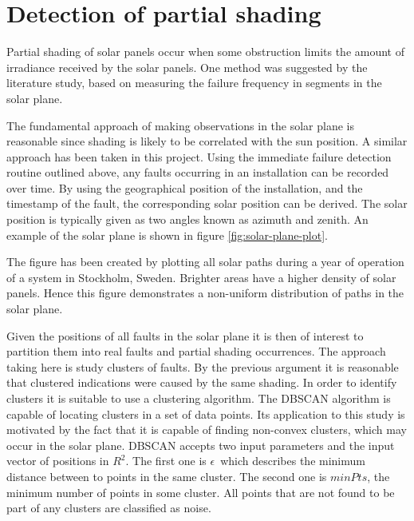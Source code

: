 \clearpage
\section{Detection of partial shading}
Partial shading of solar panels occur when some obstruction limits the amount of irradiance received by the solar panels.
One method was suggested by the literature study, based on measuring the failure frequency in segments in the solar plane.

The fundamental approach of making observations in the solar plane is reasonable since shading is likely to be correlated with the sun position.
A similar approach has been taken in this project.
Using the immediate failure detection routine outlined above, any faults occurring in an installation can be recorded over time.
By using the geographical position of the installation, and the timestamp of the fault, the corresponding solar position can be derived.
The solar position is typically given as two angles known as azimuth and zenith.
An example of the solar plane is shown in figure \ref{fig:solar-plane-plot}.


The figure has been created by plotting all solar paths during a year of operation of a system in Stockholm, Sweden.
Brighter areas have a higher density of solar panels.
Hence this figure demonstrates a non-uniform distribution of paths in the solar plane.

Given the positions of all faults in the solar plane it is then of interest to partition them into real faults and partial shading occurrences.
The approach taking here is study clusters of faults.
By the previous argument it is reasonable that clustered indications were caused by the same shading.
In order to identify clusters it is suitable to use a clustering algorithm.
The DBSCAN algorithm \cite{Birant2007} is capable of locating clusters in a set of data points.
Its application to this study is motivated by the fact that it is capable of finding non-convex clusters, which may occur in the solar plane.
DBSCAN accepts two input parameters and the input vector of positions in $R^2$.
The first one is $\epsilon$ which describes the minimum distance between to points in the same cluster.
The second one is $minPts$, the minimum number of points in some cluster.
All points that are not found to be part of any clusters are classified as noise.

